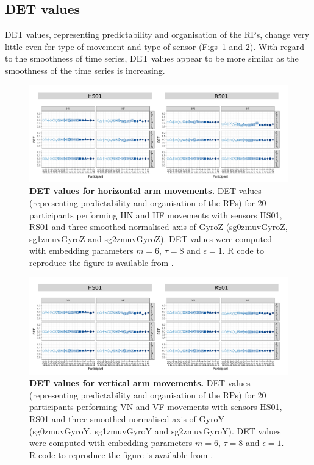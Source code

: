 

\subsection{DET values}
DET values, representing predictability and organisation of the RPs, 
change very little even for type of movement and type of sensor
(Figs~\ref{fig:det_aH} and \ref{fig:det_aV}).
With regard to the smoothness of time series, DET values appear 
to be more similar as the smoothness of the time series is increasing.
\begin{figure}[!h]
\centering
\includegraphics[width=1.0\textwidth]{det_aH}
    \caption{
	{\bf DET values for horizontal arm movements.}	
    	DET values (representing predictability and organisation of the RPs)
	for 20 participants performing HN and HF movements
	with sensors HS01, RS01 and three smoothed-normalised axis 
	of GyroZ (sg0zmuvGyroZ, sg1zmuvGyroZ and sg2zmuvGyroZ).
	DET values were computed with 
	embedding parameters $m=6$, $\tau=8$ and $\epsilon=1$.
	R code to reproduce the figure is available from \cite{hwum2018}.
        }
    \label{fig:det_aH}
\end{figure}
\begin{figure}[!h]
\centering
\includegraphics[width=1.0\textwidth]{det_aV}
    \caption{
	{\bf DET values for vertical arm movements.}	
    	DET values (representing predictability and organisation of the RPs) 
	for 20 participants performing VN and VF movements
	with sensors HS01, RS01 and three smoothed-normalised axis 
	of GyroY (sg0zmuvGyroY, sg1zmuvGyroY and sg2zmuvGyroY).
	DET values were computed with 
	embedding parameters $m=6$, $\tau=8$ and $\epsilon=1$.
	R code to reproduce the figure is available from \cite{hwum2018}.
        }
    \label{fig:det_aV}
\end{figure}



